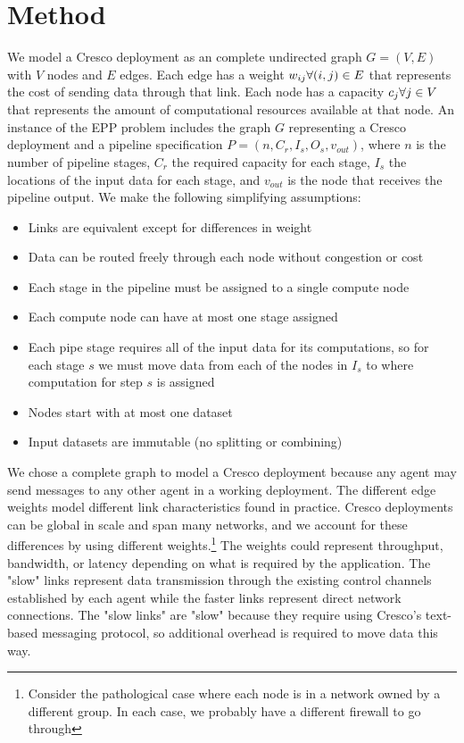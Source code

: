 \documentclass{article}
\newcommand{\forallv}[1]{\ensuremath{\forall #1 \in V}}
\newcommand{\foralle}[2]{\ensuremath{\forall (#1,#2) \in E }}
\newcommand{\eppInstance}{\ensuremath{n,C_{r},I_{s},O_{s},v_{out}}}
\begin{document}
    \section{Method}
	We model a Cresco deployment as an complete undirected graph $G=(V,E)$ with $V$ nodes and $E$ edges. Each edge has a weight $w_{ij} \space \foralle{i}{j}$ that represents the cost of sending data through that link. Each node has a capacity $c_{j} \space \forallv{j}$ that represents the amount of computational resources available at that node. An instance of the EPP problem includes the graph $G$ representing a Cresco deployment and a pipeline specification $P = (\eppInstance)$, where  $n$ is the number of pipeline stages, $C_{r}$ the required capacity for each stage, $I_{s}$ the locations of the input data for each stage, and $v_{out}$ is the node that receives the pipeline output. We make the following simplifying assumptions:
	\begin{itemize}
		\item Links are equivalent except for differences in weight
		\item Data can be routed freely through each node without congestion or cost
		\item Each stage in the pipeline must be assigned to a single compute node
		\item Each compute node can have at most one stage assigned
		\item Each pipe stage requires all of the input data for its computations, so for each stage $s$ we must move data from each of the nodes in $I_{s}$ to where computation for step $s$ is assigned
		\item Nodes start with at most one dataset
		\item Input datasets are immutable (no splitting or combining)
	\end{itemize}
	
	We chose a complete graph to model a Cresco deployment because any agent may send messages to any other agent in a working deployment. The different edge weights model different link characteristics found in practice. Cresco deployments can be global in scale and span many networks, and we account for these differences by using different weights.\footnote{Consider the pathological case where each node is in a network owned by a different group. In each case, we probably have a different firewall to go through} The weights could represent throughput, bandwidth, or latency depending on what is required by the application. The "slow" links represent data transmission through the existing control channels established by each agent while the faster links represent direct network connections. The "slow links" are "slow" because they require using Cresco's text-based messaging protocol, so additional overhead is required to move data this way.
	
\end{document}

